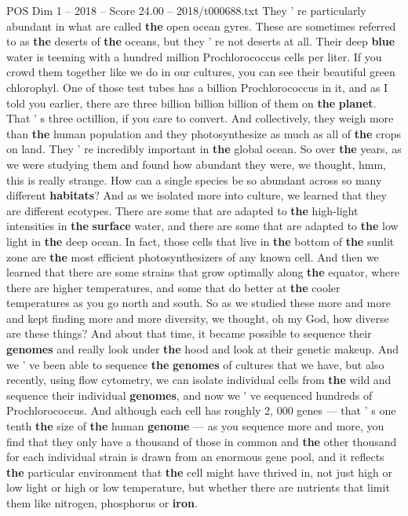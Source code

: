 \begin{textsample}{POS Dim 1 – 2018 – Score 24.00 – 2018/t000688.txt}
They ' re particularly abundant in what are called \textbf{the} open ocean gyres.
These are sometimes referred to as \textbf{the} deserts of \textbf{the} oceans, but they ' re not deserts at all.
Their deep \textbf{blue} water is teeming with a hundred million Prochlorococcus cells per liter.
If you crowd them together like we do in our cultures, you can see their beautiful green chlorophyl.
One of those test tubes has a billion Prochlorococcus in it, and as I told you earlier, there are three billion billion billion of them on \textbf{the} \textbf{planet}.
That ' s three octillion, if you care to convert.
And collectively, they weigh more than \textbf{the} human population and they photosynthesize as much as all of \textbf{the} crops on land.
They ' re incredibly important in \textbf{the} global ocean.
So over \textbf{the} years, as we were studying them and found how abundant they were, we thought, hmm, this is really strange.
How can a single species be so abundant across so many different \textbf{habitats}?
And as we isolated more into culture, we learned that they are different ecotypes.
There are some that are adapted to \textbf{the} high-light intensities in \textbf{the} \textbf{surface} water, and there are some that are adapted to \textbf{the} low light in \textbf{the} deep ocean.
In fact, those cells that live in \textbf{the} bottom of \textbf{the} sunlit zone are \textbf{the} most efficient photosynthesizers of any known cell.
And then we learned that there are some strains that grow optimally along \textbf{the} equator, where there are higher temperatures, and some that do better at \textbf{the} cooler temperatures as you go north and south.
So as we studied these more and more and kept finding more and more diversity, we thought, oh my God, how diverse are these things?
And about that time, it became possible to sequence their \textbf{genomes} and really look under \textbf{the} hood and look at their genetic makeup.
And we ' ve been able to sequence \textbf{the} \textbf{genomes} of cultures that we have, but also recently, using flow cytometry, we can isolate individual cells from \textbf{the} wild and sequence their individual \textbf{genomes}, and now we ' ve sequenced hundreds of Prochlorococcus.
And although each cell has roughly 2, 000 genes — that ' s one tenth \textbf{the} size of \textbf{the} human \textbf{genome} — as you sequence more and more, you find that they only have a thousand of those in common and \textbf{the} other thousand for each individual strain is drawn from an enormous gene pool, and it reflects \textbf{the} particular environment that \textbf{the} cell might have thrived in, not just high or low light or high or low temperature, but whether there are nutrients that limit them like nitrogen, phosphorus or \textbf{iron}.

\end{textsample}
